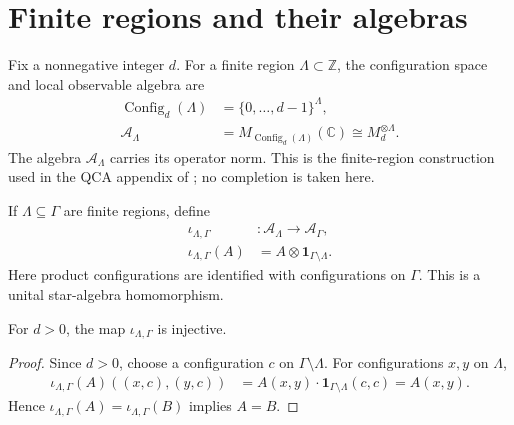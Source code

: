\section{Finite regions and their algebras}

\begin{definition}
    \label{def:qca_local_algebra}
    \leanok
    Fix a nonnegative integer $d$.  For a finite region
    $\Lambda\subset\mathbb Z$, the configuration space and local observable
    algebra are
    \begin{align}
        \operatorname{Config}_d(\Lambda)
         & =\{0,\ldots,d-1\}^{\Lambda},                     \\
        \mathcal A_\Lambda
         & =M_{\operatorname{Config}_d(\Lambda)}(\mathbb C)
        \cong M_d^{\otimes\Lambda}.
    \end{align}
    The algebra $\mathcal A_\Lambda$ carries its operator norm.  This is the
    finite-region construction used in the QCA appendix of
    \cite{Cirac2017MPU}; no completion is taken here.
\end{definition}

\begin{definition}
    \label{def:qca_local_inclusion}
    \leanok
    If $\Lambda\subseteq\Gamma$ are finite regions, define
    \begin{align}
        \iota_{\Lambda,\Gamma} & \colon\mathcal A_\Lambda\longrightarrow
        \mathcal A_\Gamma,                                                      \\
        \iota_{\Lambda,\Gamma}(A)
                               & = A\otimes \mathbf 1_{\Gamma\setminus\Lambda}.
    \end{align}
    Here product configurations are identified with configurations on
    $\Gamma$.  This is a unital star-algebra homomorphism.
\end{definition}

\begin{lemma}
    \label{lem:qca_local_inclusion_injective}
    \leanok
    For $d>0$, the map $\iota_{\Lambda,\Gamma}$ is injective.
\end{lemma}

\begin{proof}\leanok
    Since $d>0$, choose a configuration $c$ on
    $\Gamma\setminus\Lambda$.  For configurations $x,y$ on $\Lambda$,
    \begin{align}
        \iota_{\Lambda,\Gamma}(A)((x,c),(y,c))
         & =A(x,y)\cdot\mathbf 1_{\Gamma\setminus\Lambda}(c,c)
        =A(x,y).
    \end{align}
    Hence $\iota_{\Lambda,\Gamma}(A)=\iota_{\Lambda,\Gamma}(B)$ implies
    $A=B$.
\end{proof}

